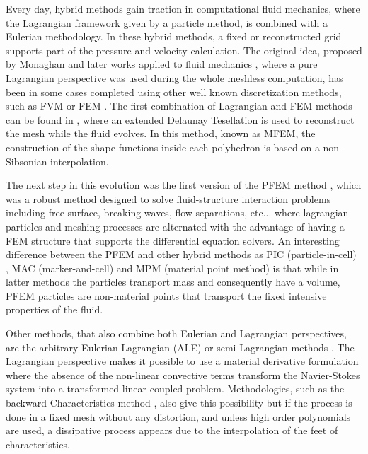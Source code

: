 
Every day, hybrid methods gain traction in computational fluid mechanics, where the Lagrangian framework given by a particle method, is combined with a Eulerian methodology. In these hybrid methods, a fixed or reconstructed grid supports part of the pressure and velocity calculation. The original idea, proposed by Monaghan \cite{Mon77} and later works applied to fluid mechanics \cite{Monaghan88}, where a pure Lagrangian perspective was used during the whole meshless computation, has been in some cases completed using other well known discretization methods, such as FVM \cite{Nestor20091733} or FEM \cite{Ide03}. The first combination of Lagrangian and FEM methods can be found in \cite{Ide03b}, where an extended Delaunay Tesellation is used to reconstruct the mesh while the fluid evolves. In this method, known as MFEM, the construction of the shape functions inside each polyhedron is based on a non-Sibsonian interpolation.

The next step in this evolution was the first version of the PFEM method \cite{Idelsohn04}, which was a robust method designed to solve fluid-structure interaction problems including free-surface, breaking waves, flow separations, etc... where lagrangian particles and meshing processes are alternated with the advantage of having a FEM structure that supports the differential equation solvers. An interesting difference between the PFEM and other hybrid methods as PIC (particle-in-cell) \cite{Harlow55}, MAC (marker-and-cell) \cite{Harlow65} and MPM (material point method) \cite{Wieckowsky04} is that while in latter methods the particles transport mass and consequently have a volume, PFEM particles are non-material points that transport the fixed intensive properties of the fluid.

Other methods, that also combine both Eulerian and Lagrangian perspectives, are the arbitrary Eulerian-Lagrangian (ALE) \cite{Donea83} or semi-Lagrangian methods \cite{Bermejo}. The Lagrangian perspective makes it possible to use a material derivative formulation where the absence of the non-linear convective terms transform the Navier-Stokes system into a transformed linear coupled problem. Methodologies, such as the backward Characteristics method \cite{Bermejo}, also give this possibility but if the process is done in a fixed mesh without any distortion, and unless high order polynomials are used, a dissipative process appears due to the interpolation of the feet of characteristics.

